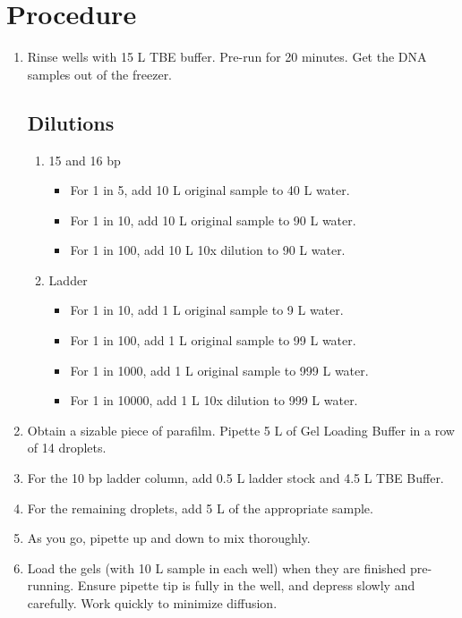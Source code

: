 \documentclass[letterpaper]{article}
\newcommand{\uL}{\micro{}L}
\begin{document}
\section{Procedure}%
\begin{enumerate} %
\item{Rinse wells with 15 \uL{} TBE buffer. Pre-run for 20 minutes. Get the DNA samples out of the freezer.} %
\subsection{Dilutions}
\begin{enumerate}
\item{15 and 16 bp}
\begin{itemize}
\item{For 1 in 5, add 10 \uL{} original sample to 40 \uL{} water.}
\item{For 1 in 10, add 10 \uL{} original sample to 90 \uL{} water.}
\item{For 1 in 100, add 10 \uL{} 10x dilution to 90 \uL{} water.}
\end{itemize}
\item{Ladder}
\begin{itemize}
\item{For 1 in 10, add 1 \uL{} original sample to 9 \uL{} water.}
\item{For 1 in 100, add 1 \uL{} original sample to 99 \uL{} water.}
\item{For 1 in 1000, add 1 \uL{} original sample to 999 \uL{} water.}
\item{For 1 in 10000, add 1 \uL{} 10x dilution to 999 \uL{} water.}
\end{itemize}
\end{enumerate}
\item{Obtain a sizable piece of parafilm. Pipette 5 \uL{} of Gel Loading Buffer in a row of 14 droplets.}
\item{For the 10 bp ladder column, add 0.5 \uL{} ladder stock and 4.5 \uL{} TBE Buffer.}
\item{For the remaining droplets, add 5 \uL{} of the appropriate sample.}
\item{As you go, pipette up and down to mix thoroughly.}
\item{Load the gels (with 10 \uL{} sample in each well) when they are finished pre-running. Ensure pipette tip is fully in the well, and depress slowly and carefully. Work quickly to minimize diffusion.}


\end{enumerate}
\end{document}
